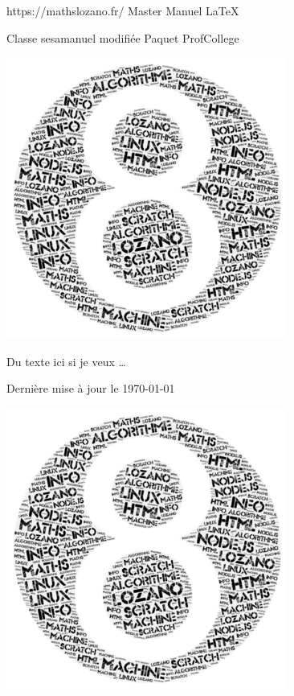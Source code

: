 \pagestyle{backCover}
\parindent=0pt
https://mathslozano.fr/  Master Manuel \LaTeX 

Classe sesamanuel modifiée Paquet ProfCollege
\begin{center}
    \includegraphics[scale=0.5]{images/8.png}%
\end{center}
\hrulefill

Du texte ici si je veux \ldots

\hrulefill
\vspace*{1cm}
\begin{center}\bfseries\Large
    \myAuthorName
\end{center}
\begin{center}\bfseries
    \myAuthorSchoolName

    \currentSchoolYear
\end{center}    
\begin{center}\bfseries\textcolor{red}
    \myMessage
\end{center}
    
\begin{flushright}
       Dernière mise à jour le \today 
\end{flushright}   
\begin{center}
    \includegraphics[scale=0.5]{images/8.png}%
\end{center}
